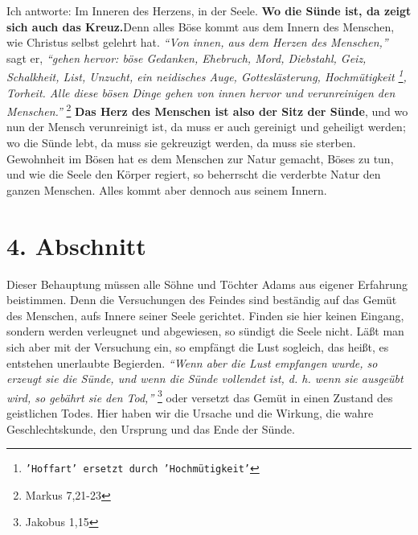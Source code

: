 \label{ref:03_03_ort_des_kreuzes}
Ich antworte: Im Inneren des Herzens, in der Seele. \textbf{Wo die Sünde ist,
da zeigt
sich auch das Kreuz.}Denn alles Böse kommt aus dem Innern des Menschen, wie
Christus selbst gelehrt hat.
\textit{"`Von innen, aus dem Herzen des Menschen,"'} sagt er,
\textit{"`gehen hervor: böse Gedanken, Ehebruch, Mord, Diebstahl, Geiz, Schalkheit,
List, Unzucht, ein neidisches Auge, Gotteslästerung,
Hochmütigkeit
\footnote{\texttt{'Hoffart' ersetzt durch 'Hochmütigkeit'}},
Torheit. Alle
diese bösen Dinge gehen von innen hervor und verunreinigen den
Menschen."'}
\footnote{Markus 7,21-23}
\textbf{Das Herz des Menschen ist also der Sitz der Sünde},
 und wo nun der Mensch
verunreinigt ist, da muss er auch gereinigt und
geheiligt werden; wo die Sünde lebt, da muss sie gekreuzigt werden, da muss sie
sterben. Gewohnheit im Bösen hat es dem Menschen zur Natur gemacht, Böses zu
tun, und wie die Seele den Körper regiert, so beherrscht die verderbte Natur
den ganzen Menschen. Alles kommt aber dennoch aus seinem Innern.

\section{4. Abschnitt} \label{kap3_ab4}

Dieser Behauptung müssen alle Söhne und Töchter Adams aus eigener Erfahrung
beistimmen. Denn die Versuchungen des Feindes sind beständig auf das Gemüt des
Menschen, aufs Innere seiner Seele gerichtet. Finden sie hier keinen Eingang,
sondern werden verleugnet und abgewiesen, so sündigt die Seele nicht. Läßt man
sich aber mit der Versuchung ein, so empfängt die Lust sogleich, das heißt, es
entstehen unerlaubte Begierden.
\textit{"`Wenn aber die Lust empfangen wurde, so erzeugt
sie die Sünde, und wenn die Sünde vollendet ist, d. h. wenn sie ausgeübt wird,
so gebährt sie den Tod,"'}
\footnote{Jakobus 1,15}
oder versetzt das Gemüt in einen
Zustand des geistlichen Todes. Hier haben wir die
Ursache und die Wirkung, die
wahre Geschlechtskunde, den Ursprung und das Ende der Sünde.

\medskip

